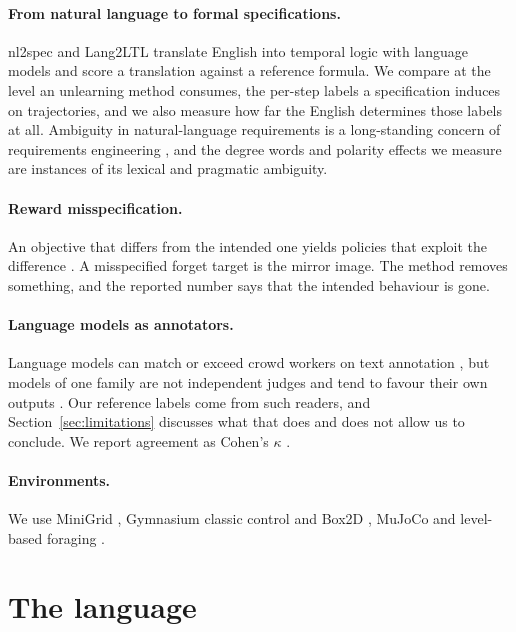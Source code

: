 \documentclass{article}
\begin{document}
\paragraph{From natural language to formal specifications.} nl2spec
\citep{cosler2023nl2spec} and Lang2LTL \citep{liu2023lang2ltl} translate
English into temporal logic with language models and score a translation
against a reference formula. We compare at the level an unlearning method
consumes, the per-step labels a specification induces on trajectories,
and we also measure how far the English determines those labels at all.
Ambiguity in natural-language requirements is a long-standing concern of
requirements engineering \citep{berry2004ambiguity}, and the degree words
and polarity effects we measure are instances of its lexical and
pragmatic ambiguity.

\paragraph{Reward misspecification.} An objective that differs from the
intended one yields policies that exploit the difference
\citep{pan2022effects,skalse2022defining}. A misspecified forget target is
the mirror image. The method removes something, and the reported number
says that the intended behaviour is gone.

\paragraph{Language models as annotators.} Language models can match or
exceed crowd workers on text annotation \citep{gilardi2023chatgpt}, but
models of one family are not independent judges and tend to favour their
own outputs \citep{panickssery2024llm}. Our reference labels come from
such readers, and Section~\ref{sec:limitations} discusses what that does
and does not allow us to conclude. We report agreement as Cohen's
$\kappa$ \citep{cohen1960coefficient}.

\paragraph{Environments.} We use MiniGrid \citep{chevalier2023minigrid},
Gymnasium classic control and Box2D \citep{towers2024gymnasium}, MuJoCo
\citep{todorov2012mujoco} and level-based foraging
\citep{papoudakis2021benchmarking}.

\section{The language}
\label{sec:language}
\end{document}
